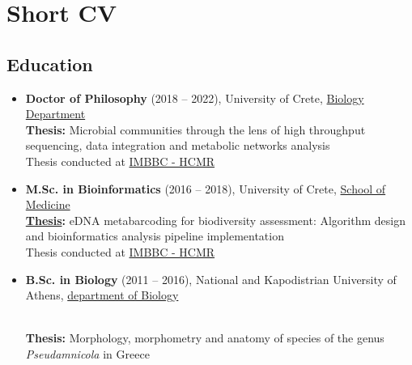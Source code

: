 % 
% 

\chapter{Short CV}
\label{cha:cv}


\section*{Education}

\begin{itemize}

	\item{
      \textbf{Doctor of Philosophy} (2018 -- 2022), 
      University of Crete, \href{https://www.biology.uoc.gr/en}{Biology Department} \\
      \textbf{Thesis:}
      Microbial communities through the lens of high throughput sequencing, 
      data integration and metabolic networks analysis \\
      Thesis conducted at \href{https://imbbc.hcmr.gr/}{IMBBC - HCMR}
   }

	\item{
      \textbf{M.Sc. in  Bioinformatics} (2016 -- 2018), 
      University of Crete, \href{http://www.english.med.uoc.gr/}{School of Medicine} \\ 
      \textbf{\href{https://www.openarchives.gr/aggregator-openarchives/edm/elocus/000018-dlib_5_2_f_metadata-dlib-1545038085-364284-26948.tkl}{Thesis}:}
      eDNA metabarcoding for biodiversity assessment: Algorithm design and bioinformatics analysis pipeline implementation \\
      Thesis conducted at \href{https://imbbc.hcmr.gr/}{IMBBC - HCMR}
   }
    
	\item{
      
      \textbf{B.Sc. in Biology} (2011 -- 2016), 
      National and Kapodistrian University of Athens, \href{http://en.biol.uoa.gr/}{department of Biology}}\\ 
      \textbf{Thesis:}
		Morphology, morphometry and anatomy of species of the genus \textit{Pseudamnicola} in Greece
		
\end{itemize}





